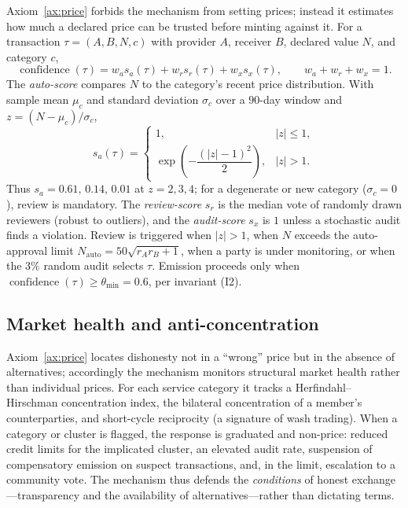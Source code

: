 \documentclass[11pt]{article}
\theoremstyle{plain}
\theoremstyle{definition}
\theoremstyle{remark}
\newcommand{\confidence}{\operatorname{confidence}}
\begin{document}
Axiom~\ref{ax:price} forbids the mechanism from setting prices; instead it estimates how much a declared price can be trusted before minting against it. For a transaction $\tau=(A,B,N,c)$ with provider $A$, receiver $B$, declared value $N$, and category $c$,
\begin{equation}
\confidence(\tau) = w_a s_a(\tau) + w_r s_r(\tau) + w_x s_x(\tau), \qquad w_a+w_r+w_x=1 .
\end{equation}
The \emph{auto-score} compares $N$ to the category's recent price distribution. With sample mean $\mu_c$ and standard deviation $\sigma_c$ over a $90$-day window and $z = (N-\mu_c)/\sigma_c$,
\begin{equation}\label{eq:autoscore}
s_a(\tau) = \begin{cases} 1, & |z| \le 1,\\[3pt] \exp\!\left(-\dfrac{(|z|-1)^2}{2}\right), & |z| > 1. \end{cases}
\end{equation}
Thus $s_a = 0.61,\,0.14,\,0.01$ at $z = 2,3,4$; for a degenerate or new category ($\sigma_c=0$), review is mandatory. The \emph{review-score} $s_r$ is the median vote of randomly drawn reviewers (robust to outliers), and the \emph{audit-score} $s_x$ is $1$ unless a stochastic audit finds a violation. Review is triggered when $|z|>1$, when $N$ exceeds the auto-approval limit $N_{\mathrm{auto}} = 50\sqrt{r_A r_B + 1}$, when a party is under monitoring, or when the $3\%$ random audit selects $\tau$. Emission proceeds only when $\confidence(\tau) \ge \theta_{\min} = 0.6$, per invariant (I2).

\subsection{Market health and anti-concentration}

Axiom~\ref{ax:price} locates dishonesty not in a ``wrong'' price but in the absence of alternatives; accordingly the mechanism monitors structural market health rather than individual prices. For each service category it tracks a Herfindahl--Hirschman concentration index, the bilateral concentration of a member's counterparties, and short-cycle reciprocity (a signature of wash trading). When a category or cluster is flagged, the response is graduated and non-price: reduced credit limits for the implicated cluster, an elevated audit rate, suspension of compensatory emission on suspect transactions, and, in the limit, escalation to a community vote. The mechanism thus defends the \emph{conditions} of honest exchange---transparency and the availability of alternatives---rather than dictating terms.
\end{document}
